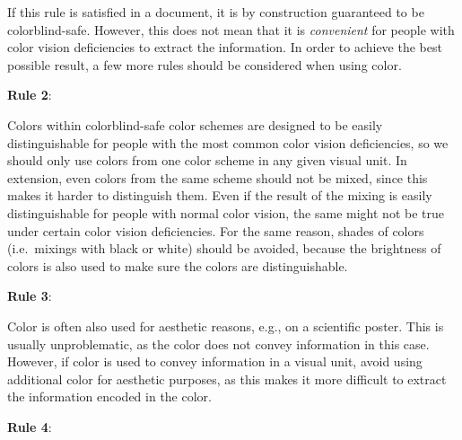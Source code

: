 \documentclass{scrartcl}
\begin{document}
If this rule is satisfied in a document, it is by construction guaranteed to be colorblind-safe.
However, this does not mean that it is \emph{convenient} for people with color vision deficiencies to extract the information.
In order to achieve the best possible result, a few more rules should be considered when using color.
\begin{center}
	\setlength{\fboxrule}{1pt}
	\textbf{Rule 2}:
\end{center}

Colors within colorblind-safe color schemes are designed to be easily distinguishable for people with the most common color vision deficiencies, so we should only use colors from one color scheme in any given visual unit.
In extension, even colors from the same scheme should not be mixed, since this makes it harder to distinguish them.
Even if the result of the mixing is easily distinguishable for people with normal color vision, the same might not be true under certain color vision deficiencies.
For the same reason, shades of colors (i.e.\ mixings with black or white) should be avoided, because the brightness of colors is also used to make sure the colors are distinguishable.

\begin{center}
	\setlength{\fboxrule}{1pt}
	\textbf{Rule 3}:
\end{center}

Color is often also used for aesthetic reasons, e.g., on a scientific poster.
This is usually unproblematic, as the color does not convey information in this case.
However, if color is used to convey information in a visual unit, avoid using additional color for aesthetic purposes, as this makes it more difficult to extract the information encoded in the color.

\begin{center}
	\setlength{\fboxrule}{1pt}
	\textbf{Rule 4}:
\end{center}
\end{document}
